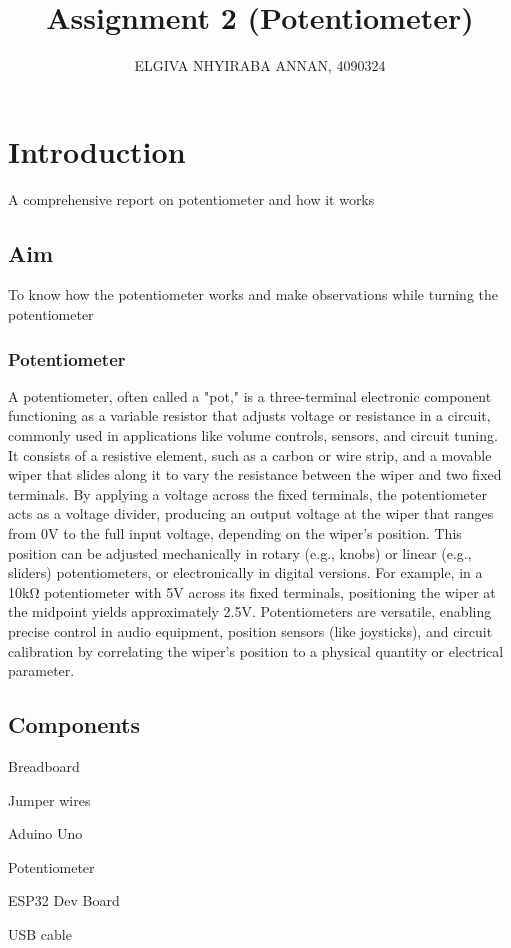 \documentclass{article}
\title{Assignment 2 (Potentiometer)}
\author{ELGIVA NHYIRABA ANNAN, 4090324}
\begin{document}
\maketitle


\section{Introduction}

A comprehensive report on potentiometer and how it works

\subsection{Aim}

To know how the potentiometer works and make observations while turning the potentiometer

\subsubsection{Potentiometer}
A potentiometer, often called a "pot," is a three-terminal electronic component functioning as a variable resistor that adjusts voltage or resistance in a circuit, commonly used in applications like volume controls, sensors, and circuit tuning. It consists of a resistive element, such as a carbon or wire strip, and a movable wiper that slides along it to vary the resistance between the wiper and two fixed terminals. By applying a voltage across the fixed terminals, the potentiometer acts as a voltage divider, producing an output voltage at the wiper that ranges from 0V to the full input voltage, depending on the wiper’s position. This position can be adjusted mechanically in rotary (e.g., knobs) or linear (e.g., sliders) potentiometers, or electronically in digital versions. For example, in a 10kΩ potentiometer with 5V across its fixed terminals, positioning the wiper at the midpoint yields approximately 2.5V. Potentiometers are versatile, enabling precise control in audio equipment, position sensors (like joysticks), and circuit calibration by correlating the wiper’s position to a physical quantity or electrical parameter.
\subsection{Components}

 \item  Breadboard
 \item  Jumper wires
 \item  Aduino Uno
 \item  Potentiometer
 \item  ESP32 Dev Board
 \item  USB cable
\end{document}
